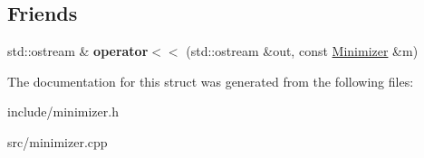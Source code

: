 \subsection*{Friends}
\begin{DoxyCompactItemize}
\item 
\mbox{\label{structMinimizer_abaa955320c5133352a39fbb9e372638b}} 
std\+::ostream \& {\bfseries operator$<$$<$} (std\+::ostream \&out, const \hyperlink{structMinimizer}{Minimizer} \&m)
\end{DoxyCompactItemize}


The documentation for this struct was generated from the following files\+:\begin{DoxyCompactItemize}
\item 
include/minimizer.\+h\item 
src/minimizer.\+cpp\end{DoxyCompactItemize}
